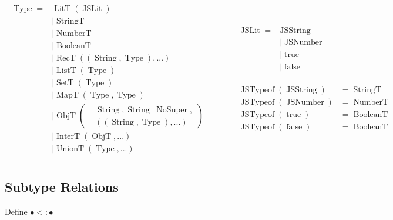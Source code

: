 \documentclass{article}
\DeclareMathOperator{\StringT}{StringT}
\DeclareMathOperator{\NumberT}{NumberT}
\DeclareMathOperator{\BooleanT}{BooleanT}
\DeclareMathOperator{\LitT}{LitT}
\DeclareMathOperator{\JSLit}{JSLit}
\DeclareMathOperator{\JSTypeof}{JSTypeof}
\DeclareMathOperator{\RecT}{RecT}
\DeclareMathOperator{\ObjT}{ObjT}
\DeclareMathOperator{\ListT}{ListT}
\DeclareMathOperator{\SetT}{SetT}
\DeclareMathOperator{\MapT}{MapT}
\DeclareMathOperator{\UnionT}{UnionT}
\DeclareMathOperator{\InterT}{InterT}
\DeclareMathOperator{\String}{String}
\DeclareMathOperator{\Type}{Type}
\DeclareMathOperator{\NoSuper}{NoSuper}
\begin{document}
\begin{align*}
\begin{aligned}
\Type = &\LitT(\JSLit) \\
&|\StringT \\
&|\NumberT \\
&|\BooleanT \\
&|\RecT((\String, \Type), ...) \\
&|\ListT(\Type) \\
&|\SetT(\Type) \\
&|\MapT(\Type, \Type) \\
&|\ObjT\left(\begin{aligned}
    &\String, \String | \NoSuper, \\
&((\String, \Type), ...)
\end{aligned}\right) \\
&|\InterT(\ObjT, ...) \\
&|\UnionT(\Type, ...)\\
\end{aligned}
\quad\quad\quad\begin{aligned}        
\begin{aligned}
\JSLit = &\operatorname{JSString} \\
&| \operatorname{JSNumber} \\
&| \operatorname{true} \\
&| \operatorname{false} \\
\end{aligned}\\\\
\begin{aligned}
\JSTypeof(\operatorname{JSString}) &= \StringT \\
\JSTypeof(\operatorname{JSNumber}) &= \NumberT \\
\JSTypeof(\operatorname{true}) &= \BooleanT \\
\JSTypeof(\operatorname{false}) &= \BooleanT \\
\end{aligned}  
\end{aligned}  
\end{align*}

\subsection{Subtype Relations}

Define \(\bullet<:\bullet\)
\end{document}
